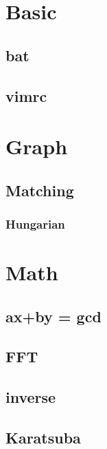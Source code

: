 \section{Basic}
	\subsection{bat}
		
	\subsection{vimrc}
		


\section{Graph}
	\subsection{Matching}
		\subsubsection{Hungarian}
			

\section{Math}
	\subsection{ ax+by = gcd }
		
	\subsection{ FFT }
		
	\subsection{ inverse }
		
	\subsection{ Karatsuba }
		

